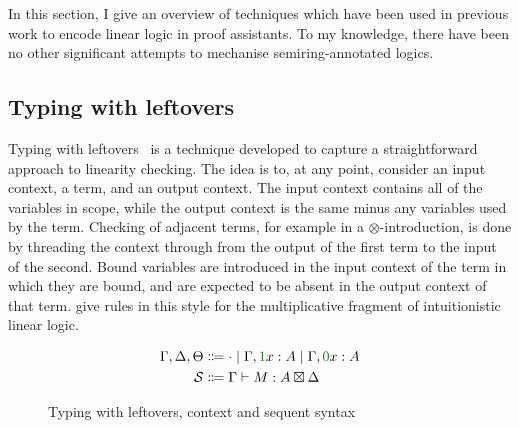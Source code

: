 In this section, I give an overview of techniques which have been used in
previous work to encode linear logic in proof assistants.
To my knowledge, there have been no other significant attempts to mechanise
semiring-annotated logics.

\subsection{Typing with leftovers}

Typing with leftovers~\cite{allais17} is a technique developed to capture a
straightforward approach to linearity checking.
The idea is to, at any point, consider an input context, a term, and an output
context.
The input context contains all of the variables in scope, while the output
context is the same minus any variables used by the term.
Checking of adjacent terms, for example in a $\otimes$-introduction, is done by
threading the context through from the output of the first term to the input of
the second.
Bound variables are introduced in the input context of the term in which they
are bound, and are expected to be absent in the output context of that term.
 give rules in this style for the multiplicative
fragment of intuitionistic linear logic.

\begin{figure}
  \begin{align*}
    \Gamma, \Delta, \Theta
    &\Coloneqq {\cdot} \mid \Gamma, \gr1x : A \mid \Gamma, \gr0x : A \\
    \mathcal{S} &\Coloneqq \Gamma \vdash M : A \boxtimes \Delta
  \end{align*}
  \caption{Typing with leftovers, context and sequent syntax}
  \label{fig:twl}
\end{figure}

